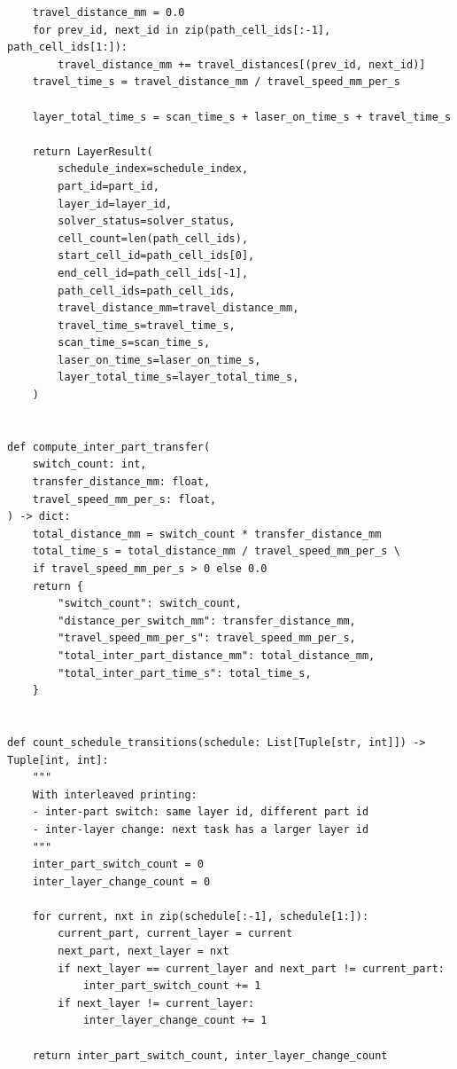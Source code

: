 \documentclass[a4paper, 12pt]{ctexart}
\begin{document}
\begin{verbatim}
    travel_distance_mm = 0.0
    for prev_id, next_id in zip(path_cell_ids[:-1], path_cell_ids[1:]):
        travel_distance_mm += travel_distances[(prev_id, next_id)]
    travel_time_s = travel_distance_mm / travel_speed_mm_per_s

    layer_total_time_s = scan_time_s + laser_on_time_s + travel_time_s

    return LayerResult(
        schedule_index=schedule_index,
        part_id=part_id,
        layer_id=layer_id,
        solver_status=solver_status,
        cell_count=len(path_cell_ids),
        start_cell_id=path_cell_ids[0],
        end_cell_id=path_cell_ids[-1],
        path_cell_ids=path_cell_ids,
        travel_distance_mm=travel_distance_mm,
        travel_time_s=travel_time_s,
        scan_time_s=scan_time_s,
        laser_on_time_s=laser_on_time_s,
        layer_total_time_s=layer_total_time_s,
    )


def compute_inter_part_transfer(
    switch_count: int,
    transfer_distance_mm: float,
    travel_speed_mm_per_s: float,
) -> dict:
    total_distance_mm = switch_count * transfer_distance_mm
    total_time_s = total_distance_mm / travel_speed_mm_per_s \
    if travel_speed_mm_per_s > 0 else 0.0
    return {
        "switch_count": switch_count,
        "distance_per_switch_mm": transfer_distance_mm,
        "travel_speed_mm_per_s": travel_speed_mm_per_s,
        "total_inter_part_distance_mm": total_distance_mm,
        "total_inter_part_time_s": total_time_s,
    }


def count_schedule_transitions(schedule: List[Tuple[str, int]]) -> Tuple[int, int]:
    """
    With interleaved printing:
    - inter-part switch: same layer id, different part id
    - inter-layer change: next task has a larger layer id
    """
    inter_part_switch_count = 0
    inter_layer_change_count = 0

    for current, nxt in zip(schedule[:-1], schedule[1:]):
        current_part, current_layer = current
        next_part, next_layer = nxt
        if next_layer == current_layer and next_part != current_part:
            inter_part_switch_count += 1
        if next_layer != current_layer:
            inter_layer_change_count += 1

    return inter_part_switch_count, inter_layer_change_count



\end{verbatim}
\end{document}
